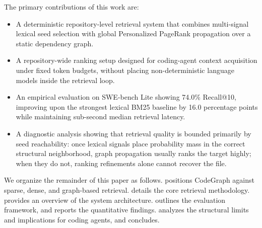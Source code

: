 The primary contributions of this work are:
\begin{itemize}
    \item A deterministic repository-level retrieval system that combines multi-signal lexical seed selection with global Personalized PageRank propagation over a static dependency graph.
    \item A repository-wide ranking setup designed for coding-agent context acquisition under fixed token budgets, without placing non-deterministic language models inside the retrieval loop.
    \item An empirical evaluation on SWE-bench Lite showing 74.0\% Recall@10, improving upon the strongest lexical BM25 baseline by 16.0 percentage points while maintaining sub-second median retrieval latency.
    \item A diagnostic analysis showing that retrieval quality is bounded primarily by seed reachability: once lexical signals place probability mass in the correct structural neighborhood, graph propagation usually ranks the target highly; when they do not, ranking refinements alone cannot recover the file.
\end{itemize}

We organize the remainder of this paper as follows.  positions CodeGraph against sparse, dense, and graph-based retrieval.  details the core retrieval methodology.  provides an overview of the system architecture.  outlines the evaluation framework, and  reports the quantitative findings.  analyzes the structural limits and implications for coding agents, and  concludes.
